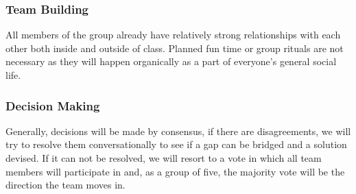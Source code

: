 \documentclass{article}
\begin{document}
\subsubsection*{Team Building}


\par{All members of the group already have relatively strong relationships with each other both inside and outside of class. Planned fun time or group rituals are
not necessary as they will happen organically as a part of everyone's general social life.}

\subsubsection*{Decision Making} 


\par{Generally, decisions will be made by consensus, if there are
disagreements, we will try to resolve them conversationally to see if a gap can be bridged and a solution devised. If it can not be resolved, we will
resort to a vote in which all team members will participate in and, as a group of five, the majority vote will be the direction the team moves in. }
\end{document}
